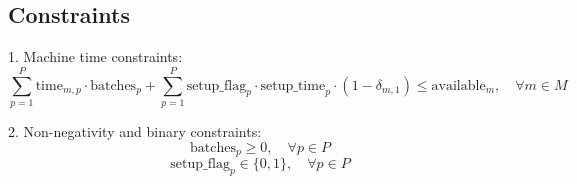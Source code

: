 \documentclass{article}
\begin{document}
\subsection*{Constraints}
1. Machine time constraints:
\[
\sum_{p=1}^{P} \text{time}_{m,p} \cdot \text{batches}_{p} + \sum_{p=1}^{P} \text{setup\_flag}_{p} \cdot \text{setup\_time}_{p} \cdot (1 - \delta_{m,1}) \leq \text{available}_{m}, \quad \forall m \in M
\]

2. Non-negativity and binary constraints:
\[
\text{batches}_{p} \geq 0, \quad \forall p \in P
\]
\[
\text{setup\_flag}_{p} \in \{0, 1\}, \quad \forall p \in P
\]
\end{document}
